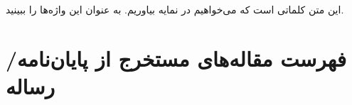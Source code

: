 \documentclass[msc]{AlzahraThesis}
\begin{document}
\begin{spacing}{1.5}

\tableofcontents
\IncludeNotationPage{

}

\listoftables
\newpage
\listoffigures
\newpage
\end{spacing}


\pagestyle{fancy}
\IncludePrefacePage{

}



این متن 
کلماتی است که می‌خواهیم در نمایه بیاوریم. به عنوان
این واژه‌ها را ببینید.


%
%

%




\pagestyle{empty}

\appendixMode








\newpage
\section*{فهرست مقاله‌های مستخرج از پایان‌نامه/رساله}
\end{document}
